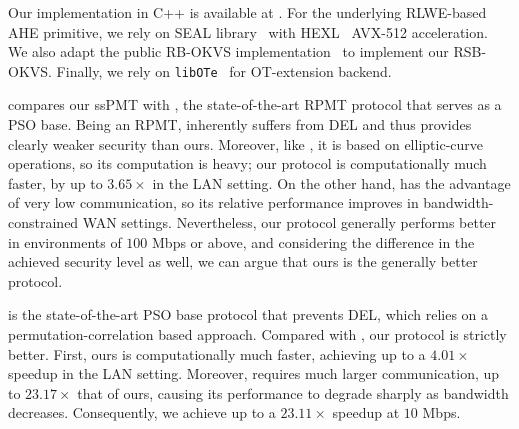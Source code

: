 Our implementation in C++ is available at \cite{RLWE-OKVS-git}. For the underlying RLWE-based AHE primitive, we rely on SEAL library~\cite{SEAL} with HEXL~\cite{IntelHEXL} AVX-512 acceleration. 
We also adapt the public RB-OKVS implementation~\cite{RB-github} to implement our RSB-OKVS. Finally, we rely on \texttt{libOTe}~\cite{libOTe} for OT-extension backend.


 compares our ssPMT with \cite{CZZ+24}, the state-of-the-art RPMT protocol that serves as a PSO base. Being an RPMT, \cite{CZZ+24} inherently suffers from DEL and thus provides clearly weaker security than ours. Moreover, like \cite{ZCL+23}, it is based on elliptic-curve operations, so its computation is heavy; our protocol is computationally much faster, by up to $3.65\times$ in the LAN setting. On the other hand, \cite{CZZ+24} has the advantage of very low communication, so its relative performance improves in bandwidth-constrained WAN settings. Nevertheless, our protocol generally performs better in environments of $100$ Mbps or above, and considering the difference in the achieved security level as well, we can argue that ours is the generally better protocol.

\cite{WCS+26} is the state-of-the-art PSO base protocol that prevents DEL, which relies on a permutation-correlation based approach. Compared with \cite{WCS+26}, our protocol is strictly better. First, ours is computationally much faster, achieving up to a $4.01\times$ speedup in the LAN setting. Moreover, \cite{WCS+26} requires much larger communication, up to \(23.17\times\) that of ours, causing its performance to degrade sharply as bandwidth decreases. Consequently, we achieve up to a \(23.11\times\) speedup at \(10\) Mbps.

